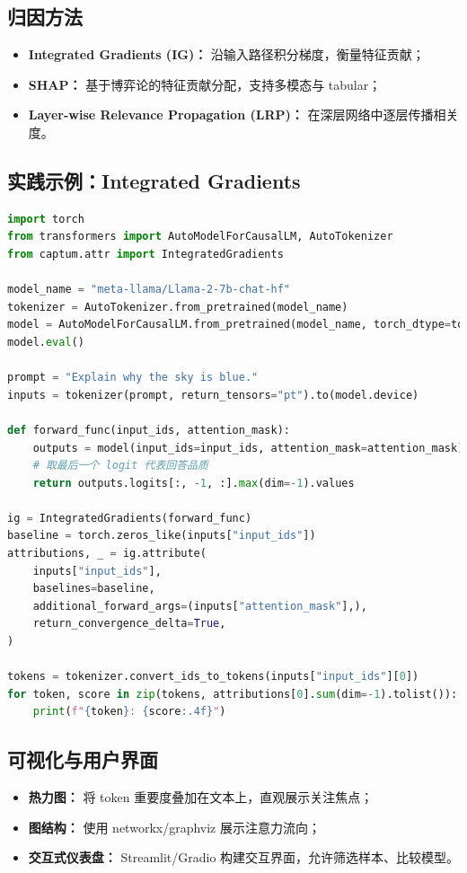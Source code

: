 \documentclass[UTF8,zihao=-4]{ctexart}
\begin{document}
\subsection{归因方法}
\begin{itemize}
  \item \textbf{Integrated Gradients (IG)：} 沿输入路径积分梯度，衡量特征贡献；
  \item \textbf{SHAP：} 基于博弈论的特征贡献分配，支持多模态与 tabular；
  \item \textbf{Layer-wise Relevance Propagation (LRP)：} 在深层网络中逐层传播相关度。
\end{itemize}

\subsection{实践示例：Integrated Gradients}
\begin{lstlisting}[language=Python,caption={对 LLaMA 进行 Integrated Gradients 归因分析}]
import torch
from transformers import AutoModelForCausalLM, AutoTokenizer
from captum.attr import IntegratedGradients

model_name = "meta-llama/Llama-2-7b-chat-hf"
tokenizer = AutoTokenizer.from_pretrained(model_name)
model = AutoModelForCausalLM.from_pretrained(model_name, torch_dtype=torch.float16).cuda()
model.eval()

prompt = "Explain why the sky is blue."
inputs = tokenizer(prompt, return_tensors="pt").to(model.device)

def forward_func(input_ids, attention_mask):
    outputs = model(input_ids=input_ids, attention_mask=attention_mask)
    # 取最后一个 logit 代表回答品质
    return outputs.logits[:, -1, :].max(dim=-1).values

ig = IntegratedGradients(forward_func)
baseline = torch.zeros_like(inputs["input_ids"])
attributions, _ = ig.attribute(
    inputs["input_ids"],
    baselines=baseline,
    additional_forward_args=(inputs["attention_mask"],),
    return_convergence_delta=True,
)

tokens = tokenizer.convert_ids_to_tokens(inputs["input_ids"][0])
for token, score in zip(tokens, attributions[0].sum(dim=-1).tolist()):
    print(f"{token}: {score:.4f}")
\end{lstlisting}

\subsection{可视化与用户界面}
\begin{itemize}
  \item \textbf{热力图：} 将 token 重要度叠加在文本上，直观展示关注焦点；
  \item \textbf{图结构：} 使用 networkx/graphviz 展示注意力流向；
  \item \textbf{交互式仪表盘：} Streamlit/Gradio 构建交互界面，允许筛选样本、比较模型。
\end{itemize}
\end{document}

